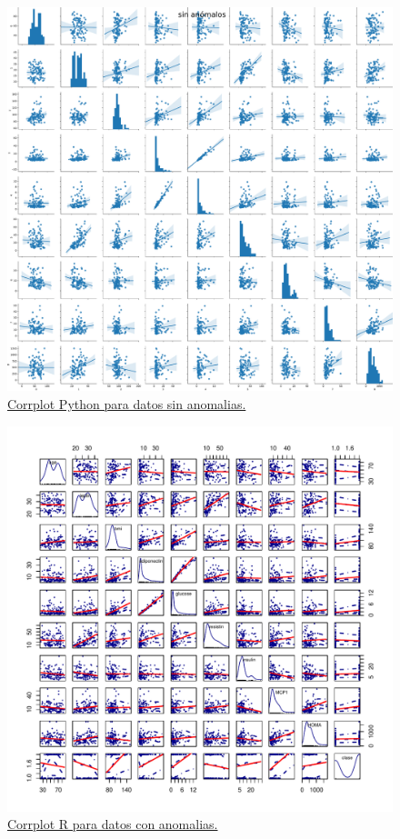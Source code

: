 \documentclass{article}
\newcommand{\figcaption}[1]{\caption[#1]{\hyperref[figs]{#1}}}
\begin{document}
\phantom{}
\vfill

\begin{figure}[h!]
\centering
\includegraphics[width = \linewidth]{../python/images/corrp1.pdf}
\figcaption{Corrplot Python para datos sin anomalias.}
\label{fig:cp1s}
\end{figure}

\vfill

\newpage
\begin{figure}[h]
\centering
\includegraphics[width = \linewidth]{../R/images/corrplot.pdf}
\figcaption{Corrplot R para datos con anomalias.}
\label{fig:corrR}
\end{figure}
\end{document}
